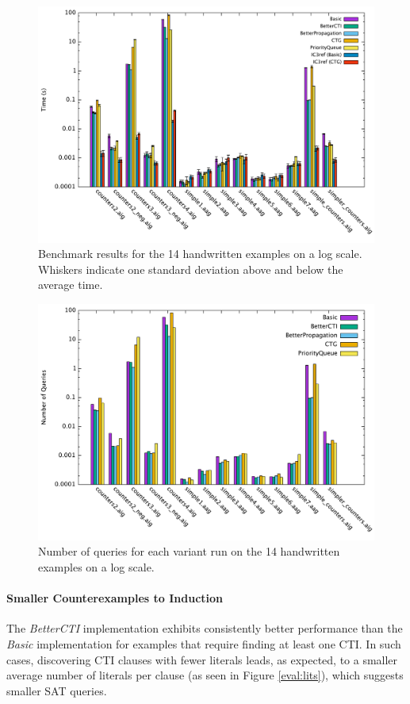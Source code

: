 \documentclass[12pt,a4paper,twoside,openright]{report}
\begin{document}
{{\begin{figure}[t]
\includegraphics[width=16cm]{handwritten.pdf}
\caption{Benchmark results for the 14 handwritten examples on a log scale. Whiskers
indicate one standard deviation above and below the average time.}
\label{eval:time}
\end{figure}

\begin{figure}[!ht]
\includegraphics[width=16cm]{numqueries.pdf}
\caption{Number of queries for each variant run on the 14 handwritten examples on a log scale.}
\label{eval:queries}
\end{figure}

\paragraph{Smaller Counterexamples to Induction}{
The \emph{BetterCTI} implementation exhibits consistently
better performance than the \emph{Basic} implementation for examples
that require finding at least one CTI. In such cases,
discovering CTI clauses with fewer literals leads, as expected, to a smaller average number of
literals per clause (as seen in Figure \ref{eval:lits}), which suggests smaller SAT queries.

}}}
\end{document}
